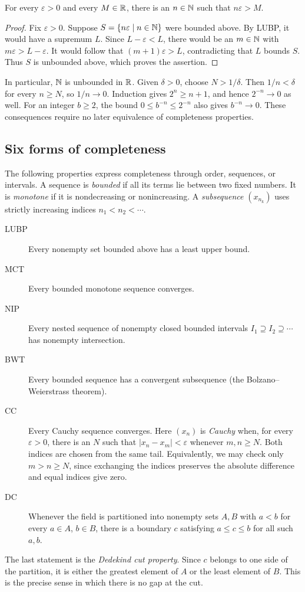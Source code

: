 \begin{theorem}
  \label{thm:analysis-i:archimedean}
  For every $\varepsilon>0$ and every $M\in\mathbb{R}$, there is an $n\in\mathbb{N}$
  such that $n\varepsilon>M$.
\end{theorem}
\begin{proof}
  Fix $\varepsilon>0$. Suppose $S=\{n\varepsilon\mid n\in\mathbb{N}\}$
  were bounded above. By LUBP, it would have a supremum $L$.
  Since $L-\varepsilon<L$, there would be an $m\in\mathbb{N}$ with
  $m\varepsilon>L-\varepsilon$. It would follow that
  $(m+1)\varepsilon>L$, contradicting that $L$ bounds $S$.
  Thus $S$ is unbounded above, which proves the assertion.
\end{proof}
In particular, $\mathbb{N}$ is unbounded in $\mathbb{R}$. Given $\delta>0$, choose
$N>1/\delta$. Then $1/n<\delta$ for every $n\geq N$, so $1/n\to0$.
Induction gives $2^n\geq n+1$, and hence $2^{-n}\to0$ as well.
For an integer $b\geq2$, the bound $0\leq b^{-n}\leq2^{-n}$ also gives
$b^{-n}\to0$.
These consequences require no later equivalence of completeness properties.

\subsection{Six forms of completeness}
The following properties express completeness through order, sequences,
or intervals. A sequence is \emph{bounded} if all its terms lie between
two fixed numbers. It is \emph{monotone} if it is nondecreasing or
nonincreasing. A \emph{subsequence} $(x_{n_k})$ uses strictly increasing
indices $n_1<n_2<\cdots$.

\begin{description}
  \item[LUBP] Every nonempty set bounded above has a least upper bound.
  \item[MCT] Every bounded monotone sequence converges.
  \item[NIP] Every nested sequence of nonempty closed bounded intervals
    $I_1\supseteq I_2\supseteq\cdots$ has nonempty intersection.
  \item[BWT] Every bounded sequence has a convergent subsequence
    (the Bolzano--Weierstrass theorem).
  \item[CC] Every Cauchy sequence converges. Here $(x_n)$ is \emph{Cauchy}
    when, for every $\varepsilon>0$, there is an $N$ such that
    $|x_n-x_m|<\varepsilon$ whenever $m,n\geq N$.
    Both indices are chosen from the same tail. Equivalently, we may
    check only $m>n\geq N$, since exchanging the indices preserves
    the absolute difference and equal indices give zero.
  \item[DC] Whenever the field is partitioned into nonempty sets $A,B$
    with $a<b$ for every $a\in A$, $b\in B$, there is a boundary $c$
    satisfying $a\leq c\leq b$ for all such $a,b$.
\end{description}
The last statement is the \emph{Dedekind cut property}. Since $c$ belongs
to one side of the partition, it is either the greatest element of $A$
or the least element of $B$. This is the precise sense in which there is
no gap at the cut.
